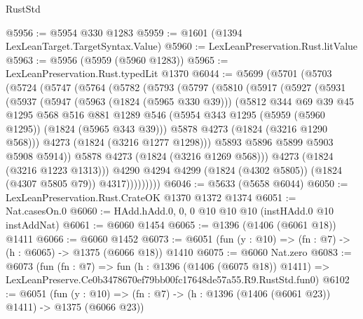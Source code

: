 \begin{lexlean}{RustStd}
\begin{coremodule}
@5956 := @5954 @330 @1283
@5959 := @1601 (@1394 LexLeanTarget.TargetSyntax.Value)
@5960 := LexLeanPreservation.Rust.litValue
@5963 := @5956 (@5959 (@5960 @1283))
@5965 := LexLeanPreservation.Rust.typedLit @1370
@6044 := @5699
    (@5701
      (@5703
        (@5724
          (@5747
            (@5764
              (@5782
                (@5793
                  (@5797
                    (@5810
                      (@5917
                        (@5927
                          (@5931
                            (@5937
                              (@5947
                                (@5963 (@1824 (@5965 @330 @39)))
                                (@5812
                                  @344
                                  @69
                                  @39
                                  @45
                                  @1295
                                  @568
                                  @516
                                  @881
                                  @1289
                                  @546
                                  (@5954 @343 @1295 (@5959 (@5960 @1295)) (@1824 (@5965 @343 @39)))
                                  @5878
                                  @4273
                                  (@1824 (@3216 @1290 @568)))
                                @4273
                                (@1824 (@3216 @1277 @1298)))
                              @5893
                              @5896
                              @5899
                              @5903
                              @5908
                              @5914))
                          @5878
                          @4273
                          (@1824 (@3216 @1269 @568)))
                        @4273
                        (@1824 (@3216 @1223 @1313)))
                      @4290
                      @4294
                      @4299
                      (@1824 (@4302 @5805))
                      (@1824 (@4307 @5805 @79))
                      @4317)))))))))
@6046 := @5633 (@5658 @6044)
@6050 := LexLeanPreservation.Rust.CrateOK @1370 @1372 @1374
@6051 := Nat.casesOn.{0}
@6060 := HAdd.hAdd.{0, 0, 0} @10 @10 @10 (instHAdd.{0} @10 instAddNat)
@6061 := @6060 @1454
@6065 := @1396 (@1406 (@6061 @18)) @1411
@6066 := @6060 @1452
@6073 := @6051 (fun (y : @10) => (fn : @7) -> (h : @6065) -> @1375 (@6066 @18)) @1410
@6075 := @6060 Nat.zero
@6083 := @6073
    (fun (fn : @7) =>
    fun (h : @1396 (@1406 (@6075 @18)) @1411) =>
    LexLeanPreserve.Ce0b3478670ef79bb00fc17648de57a55.R9.RustStd.fun0)
@6102 := @6051
    (fun (y : @10) => (fn : @7) -> (h : @1396 (@1406 (@6061 @23)) @1411) -> @1375 (@6066 @23))

\end{coremodule}
\end{lexlean}

